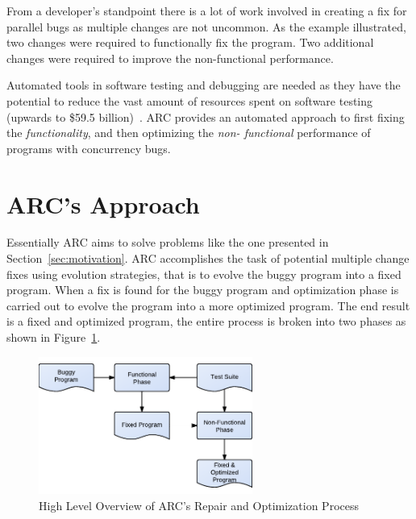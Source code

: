 \documentclass[10pt, conference, compsocconf]{IEEEtran}
\begin{document}
From a developer's standpoint there is a lot of work involved in creating a fix
for parallel bugs as multiple changes are not uncommon. As the example
illustrated, two changes were required to functionally fix the program. Two
additional changes were required to improve the non-functional performance.

Automated tools in software testing and debugging are needed as they have the
potential to reduce the vast amount of resources spent on software testing
(upwards to \$59.5 billion)~\cite{RTI02}. ARC provides an automated approach to
first fixing the \textit{functionality}, and then optimizing the \textit{non-
functional} performance of programs with concurrency bugs.

\section{ARC's Approach}
\label{sec:approach}

Essentially ARC aims to solve problems like the one presented in
Section~\ref{sec:motivation}. ARC accomplishes the task of potential multiple
change fixes using evolution strategies, that is to evolve the buggy program
into a fixed program. When a fix is found for the buggy program and
optimization phase is carried out to evolve the program into a more optimized
program. The end result is a fixed and optimized program, the entire process is
broken into two phases as shown in Figure~\ref{fig:process}.

\begin{figure}[!h]
  \centering
  \includegraphics[width=7.0cm]{figures/process.pdf}
  \caption{High Level Overview of ARC's Repair and Optimization Process}
  \label{fig:process}
\end{figure}
\end{document}
